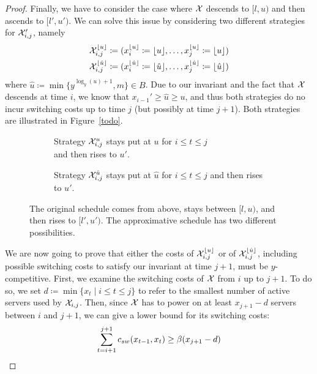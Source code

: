 \begin{proof}
Finally, we have to consider the case where $\mathcal{X}$ descends to $[l,u)$ and then ascends to $[l',u')$. We can solve this issue by considering two different strategies for $\mathcal{X}_{i,j}'$, namely
\begin{align*}
	\mathcal{X}_{i,j}^{\lfloor u\rfloor}&\coloneqq(x_i^{\lfloor u\rfloor}\coloneqq\lfloor u\rfloor,\dotsc,x_j^{\lfloor u\rfloor}\coloneqq\lfloor u\rfloor)\\
	\mathcal{X}_{i,j}^{\lfloor\hat{u}\rfloor}&\coloneqq(x_i^{\lfloor\hat{u}\rfloor}\coloneqq\lfloor\hat{u}\rfloor,\dotsc,x_j^{\lfloor\hat{u}\rfloor}\coloneqq\lfloor\hat{u}\rfloor)
\end{align*}
where $\hat{u}\coloneqq\min\{y^{\log_y(u)+1},m\}\in B$. Due to our invariant and the fact that $\mathcal{X}$ descends at time $i$, we know that $x_{i-1}'\ge \hat{u}\ge u$, and thus both strategies do no incur switching costs up to time $j$ (but possibly at time $j+1$). Both strategies are illustrated in Figure~\ref{todo}.
\begin{figure}[H]
\captionsetup[subfigure]{labelformat=empty}
\begin{subfigure}[b]{0.49\textwidth}

\caption{Strategy $\mathcal{X}_{i,j}^u$ stays put at $u$ for $i\le t\le j$\\and then rises to $u'$.}
\end{subfigure}
\hfill
\begin{subfigure}[b]{0.49\textwidth}

\caption{Strategy $\mathcal{X}_{i,j}^{\hat{u}}$ stays put at $\hat{u}$ for $i\le t\le j$ and then rises to $u'$.}
\end{subfigure}
\caption{The original schedule comes from above, stays between $[l,u)$, and then rises to $[l',u')$. The approximative schedule has two different possibilities.}
\end{figure}
We are now going to prove that either the costs of $\mathcal{X}_{i,j}^{\lfloor u\rfloor}$ or of $\mathcal{X}_{i,j}^{\lfloor\hat{u}\rfloor}$, including possible switching costs to satisfy our invariant at time $j+1$, must be $y$-competitive. 
First, we examine the switching costs of $\mathcal{X}$ from $i$ up to $j+1$. To do so, we set $d\coloneqq\min\{x_t\mid i\le t\le j\}$ to refer to the smallest number of active servers used by $\mathcal{X}_{i,j}$. Then, since $\mathcal{X}$ has to power on at least $x_{j+1}-d$ servers between $i$ and $j+1$, we can give a lower bound for its switching costs:
\begin{equation*}
	\sum\limits_{t=i+1}^{j+1}c_{sw}(x_{t-1},x_t)\ge\beta(x_{j+1}-d)
\end{equation*}

\end{proof}
